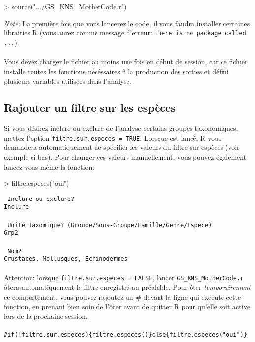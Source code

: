 \documentclass{article}
\begin{document}
\begin{Schunk}
\begin{Sinput}
> source(".../GS_KNS_MotherCode.r")
\end{Sinput}
\end{Schunk}

\emph{Note}: La première fois que vous lancerez le code, il vous
faudra installer certaines librairies R (vous aurez comme message d'erreur:
\texttt{there is no package called ...}). \\
\\

 Vous devez charger le fichier \mcode {} au moins
une fois en début de session, car ce fichier installe toutes les fonctions nécéssaires à la production des
sorties et défini plusieurs
variables utilisées dans l'analyse.

\subsection*{Rajouter un filtre sur les espèces}
Si vous désirez inclure ou exclure de l'analyse certains groupes
taxonomiques, mettez l'option \texttt{filtre.sur.especes =
  TRUE}. Lorsque \mcode {} est lancé, R vous
demandera automatiquement de spécifier les valeurs du filtre sur
espèces (voir exemple ci-bas). Pour changer ces valeurs manuellement,
vous pouvez également lancez
vous même la fonction:

\begin{Schunk}
\begin{Sinput}
> filtre.especes("oui")
\end{Sinput}
\end{Schunk}

\texttt{\color{MidnightBlue} Inclure ou exclure? } \\
\indent \indent \texttt{Inclure } \\
\\
\indent \texttt{\color{MidnightBlue} Unité taxomique? (Groupe/Sous-Groupe/Famille/Genre/Espece)} \\
\indent \indent \texttt{Grp2}\\
\\
\indent \texttt{\color{MidnightBlue} Nom?} \\
\indent \indent \texttt{Crustaces, Mollusques, Echinodermes}\\
\\

\noindent Attention: lorsque \texttt{filtre.sur.especes =
  FALSE}, lancer \texttt{GS\_KNS\_MotherCode.r} ôtera automatiquement
le filtre enregistré au préalable. Pour ôter \emph{temporairement} ce comportement,
vous pouvez rajoutez un \# devant la ligne qui exécute cette fonction,
en prenant bien soin de l'ôter avant de quitter R pour qu'elle soit
active lors de la prochaine session. \\
\\
\texttt{\#if(!filtre.sur.especes)\{filtre.especes()\}else\{filtre.especes("oui")\}}
\end{document}
